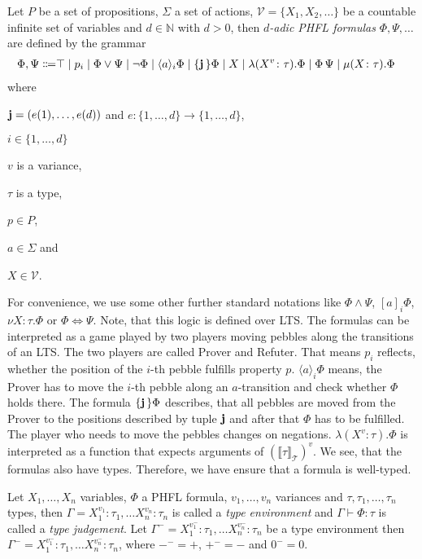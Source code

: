 \begin{definition}
    Let $P$ be a set of propositions, $\Sigma$ a set of actions, $\mathcal{V} = \{X_1, X_2, \dots\}$ be a countable
    infinite
    set of variables and $d \in \mathbb{N}$ with $d >0$, then
    \emph{$d$-adic PHFL formulas} $\Phi, \Psi,\dots$ are defined by the grammar
    \begin{align*}
        \Phi,\Psi\Coloneqq&\top \mid p_i \mid \Phi \vee \Psi \mid \neg \Phi \mid \langle a \rangle_i \Phi \mid
        \{\emph{j}\,\} \Phi \mid X \mid \lambda (X^v\colon\tau).\Phi \mid \Phi\,\Psi\mid  \mu (X\colon\tau).\Phi
    \end{align*}
    where
    \begin{compactitem}
        \item $\emph{j} = (e(1), \dots, e(d))$ and $e: \{1, \dots, d\} \rightarrow \{1, \dots, d\}$,
        \item $i \in \{1, \dots, d\}$
        \item $v$ is a variance,
        \item $\tau$ is a type,
        \item $p \in P$,
        \item $a \in \Sigma$ and
        \item $X \in \mathcal{V}$.
    \end{compactitem}
\end{definition}

For convenience, we use some other further standard notations like $\Phi \wedge \Psi$, $[a]_i\Phi$, $\nu
X \colon \tau.\Phi$ or $\Phi \Leftrightarrow \Psi$. Note, that this logic is defined over LTS. The formulas can be interpreted as a game played by two players moving pebbles along the transitions of an LTS. The two players
are called Prover and Refuter. That means $p_i$ reflects, whether the position of the $i$-th pebble fulfills
property $p$. $\langle a \rangle_i \Phi$ means, the Prover has to move the $i$-th pebble along an $a$-transition and
check whether $\Phi$ holds there. The formula $\{\emph{j}\,\} \Phi$ describes, that all pebbles
are moved from the Prover to the positions described by tuple $\emph{j}$ and after that $\Phi$ has to
be fulfilled. The player who needs to move the pebbles changes on negations. $\lambda (X^v\colon\tau).\Phi$ is
interpreted as a function that expects arguments of $(\llbracket\tau\rrbracket_\mathcal{T})^v$. We see, that the
formulas also have types. Therefore, we have ensure that a formula is well-typed.

\begin{definition}
    Let $X_1, \dots, X_n$ variables, $\Phi$ a PHFL formula, $v_1, \dots, v_n$ variances and $\tau, \tau_1, \dots,
    \tau_n$ types, then $\Gamma = X_1^{v_1}\colon \tau_1, \dots X_n^{v_n} \colon \tau_n$ is
    called a \emph{type environment} and $\Gamma \vdash \Phi\colon\tau$
    is called a \emph{type judgement}. Let $\Gamma^- = X_1^{v_1^-}\colon \tau_1, \dots
    X_n^{v_n^-} \colon \tau_n$ be a type environment then $\Gamma^- = X_1^{v_1^-}\colon \tau_1, \dots
    X_n^{v_n^-} \colon \tau_n$, where $-^- = +$, $+^- = -$ and $0^- = 0$.
\end{definition}

